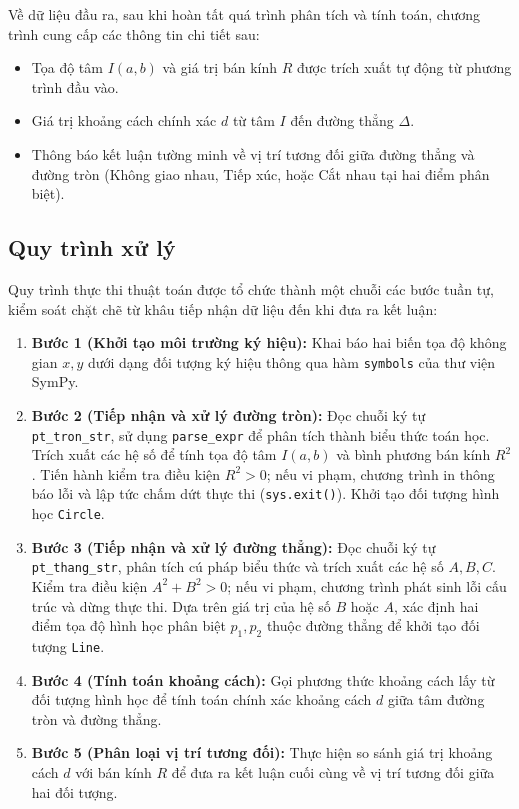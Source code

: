 \documentclass[12pt,a4paper]{article}
\begin{document}
Về dữ liệu đầu ra, sau khi hoàn tất quá trình phân tích và tính toán, chương trình cung cấp các thông tin chi tiết sau:
\begin{itemize}[leftmargin=*]
    \item Tọa độ tâm $I(a, b)$ và giá trị bán kính $R$ được trích xuất tự động từ phương trình đầu vào.
    \item Giá trị khoảng cách chính xác $d$ từ tâm $I$ đến đường thẳng $\Delta$.
    \item Thông báo kết luận tường minh về vị trí tương đối giữa đường thẳng và đường tròn (Không giao nhau, Tiếp xúc, hoặc Cắt nhau tại hai điểm phân biệt).
\end{itemize}

\subsection{Quy trình xử lý}
Quy trình thực thi thuật toán được tổ chức thành một chuỗi các bước tuần tự, kiểm soát chặt chẽ từ khâu tiếp nhận dữ liệu đến khi đưa ra kết luận:
\begin{enumerate}
    \item \textbf{Bước 1 (Khởi tạo môi trường ký hiệu):} Khai báo hai biến tọa độ không gian $x, y$ dưới dạng đối tượng ký hiệu thông qua hàm \texttt{symbols} của thư viện SymPy.
    \item \textbf{Bước 2 (Tiếp nhận và xử lý đường tròn):} Đọc chuỗi ký tự \texttt{pt\_tron\_str}, sử dụng \texttt{parse\_expr} để phân tích thành biểu thức toán học. Trích xuất các hệ số để tính tọa độ tâm $I(a, b)$ và bình phương bán kính $R^2$. Tiến hành kiểm tra điều kiện $R^2 > 0$; nếu vi phạm, chương trình in thông báo lỗi và lập tức chấm dứt thực thi (\texttt{sys.exit()}). Khởi tạo đối tượng hình học \texttt{Circle}.
    \item \textbf{Bước 3 (Tiếp nhận và xử lý đường thẳng):} Đọc chuỗi ký tự \texttt{pt\_thang\_str}, phân tích cú pháp biểu thức và trích xuất các hệ số $A, B, C$. Kiểm tra điều kiện $A^2 + B^2 > 0$; nếu vi phạm, chương trình phát sinh lỗi cấu trúc và dừng thực thi. Dựa trên giá trị của hệ số $B$ hoặc $A$, xác định hai điểm tọa độ hình học phân biệt $p_1, p_2$ thuộc đường thẳng để khởi tạo đối tượng \texttt{Line}.
    \item \textbf{Bước 4 (Tính toán khoảng cách):} Gọi phương thức khoảng cách lấy từ đối tượng hình học để tính toán chính xác khoảng cách $d$ giữa tâm đường tròn và đường thẳng.
    \item \textbf{Bước 5 (Phân loại vị trí tương đối):} Thực hiện so sánh giá trị khoảng cách $d$ với bán kính $R$ để đưa ra kết luận cuối cùng về vị trí tương đối giữa hai đối tượng.
\end{enumerate}
\end{document}
